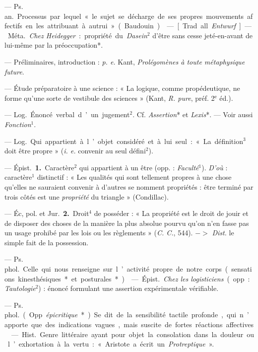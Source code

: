 \begin{itemize}[leftmargin=1cm, label=, itemsep=1pt]
 — \si{Ps. an.} Processus par lequel « le sujet se décharge
de ses propres mouvements affectifs en les attribuant à autrui » (Baudouin).

 — [Trad. all. {\it Entwurf}] — \si{Méta.} {\it Chez
Heidegger} : propriété du {\it Dasein}$^2$ d’être sans cesse jeté-en-avant
de lui-même par la préoccupation*.

 — Préliminaires, introduction : {\it p. e.} Kant, {\it
Prolégomènes à toute métaphysique future}.

 — Étude préparatoire à une science : « La logique, comme
propédeutique, ne forme qu'une sorte de vestibule des sciences » (Kant,
{\it R. pure}, préf. 2$^\text{e}$ éd.).

 — \si{Log.} Énoncé verbal d’un jugement$^2$. Cf.
{\it Assertion}* et {\it Lexis}*. — Voir aussi {\it Fonction}$^1$.

 — \si{Log.} Qui appartient à
l’objet considéré et à lui seul : « La
définition$^3$ doit être propre » ({\it i. e.} convenir au seul défini$^2$).

 — \si{Épist.} {\bf 1.} Caractère$^2$ qui appartient à un être
(opp. : {\it Faculté}$^1$). {\it D'où} : caractère$^1$ distinctif : « Les
qualités qui sont tellement propres à une chose qu'elles ne sauraient
convenir à d’autres se nomment propriétés : être terminé par trois côtés est
une {\it propriété} du triangle » (Condillac).

— Éc, pol. et \si{Jur.} {\bf 2.} Droit$^4$ de posséder : « La propriété est
le droit de jouir et de disposer des choses de la manière la plus absolue
pourvu qu’on n’en fasse pas un usage prohibé par les lois ou les règlements
» ({\it C. C.}, 544). $->$ {\it Dist.} le simple fait de la possession.

 — \si{Ps. phol.}Celle qui nous renseigne
sur l’activité propre de notre corps (sensations kinesthésiques* et
posturales*).

 — \si{Épist.} {\it Chez les logisticiens} (opp. : {\it
Tautologie}$^2$) : énoncé formulant une assertion expérimentale vérifiable.

 — \si{Ps. phol.} (Opp. {\it épicritique}*). Se dit de la
sensibilité tactile profonde, qui n’apporte que des indications vagues, mais
suscite de fortes réactions affectives.

 — \si{Hist.} Genre littéraire ayant pour objet la
consolation dans la douleur ou l’exhortation à la vertu : « Aristote a écrit
un {\it Protreptique} ».


\end{itemize}
